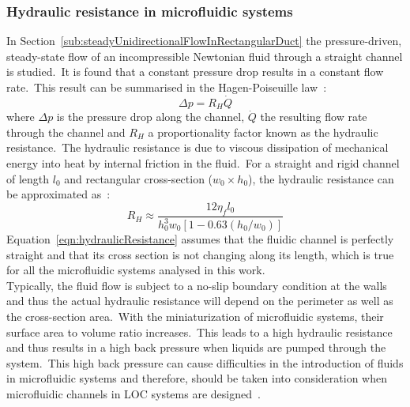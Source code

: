 \subsubsection{Hydraulic resistance in microfluidic systems}
\label{subsec:hydraulicResistanceInMicrofluidicSystems}
In Section~\ref{sub:steadyUnidirectionalFlowInRectangularDuct} the pressure-driven, steady-state flow of an incompressible Newtonian fluid through a straight channel is studied.\ It is found that a constant pressure drop results in a constant flow rate.\ This result can be summarised in the Hagen-Poiseuille law~\cite{Bruus2007}:\
\begin{equation}
	\Delta p = R_{H}\dot{Q} 
	\label{eqn:hagenPoiseuille}
\end{equation}
where $\Delta p$ is the pressure drop along the channel, $\dot{Q}$ the resulting flow rate through the channel and $R_{H}$ a proportionality factor known as the hydraulic resistance.\ The hydraulic resistance is due to viscous dissipation of mechanical energy into heat by internal friction in the fluid.\ For a straight and rigid channel of length $l_{0}$ and rectangular cross-section ($w_{0} \times h_{0}$), the hydraulic resistance can be approximated as~\cite{Bruus2007}:\
\begin{equation}
	R_{H} \approx \frac{12\eta_{f}l_{0}}{h_{0}^{3}w_{0}\left[1-0.63(h_{0}/w_{0})\right]}
	\label{eqn:hydraulicResistance}
\end{equation}
Equation~\ref{eqn:hydraulicResistance} assumes that the fluidic channel is perfectly straight and that its cross section is not changing along its length, which is true for all the microfluidic systems analysed in this work.\\
Typically, the fluid flow is subject to a no-slip boundary condition at the walls and thus the actual hydraulic resistance will depend on the perimeter as well as the cross-section area.\ With the miniaturization of microfluidic systems, their surface area to volume ratio increases.\ This leads to a high hydraulic resistance and thus results in a high back pressure when liquids are pumped through the system.\ This high back pressure can cause difficulties in the introduction of fluids in microfluidic systems and therefore, should be taken into consideration when microfluidic channels in LOC systems are designed~\cite{Bruus2007}.\
%
